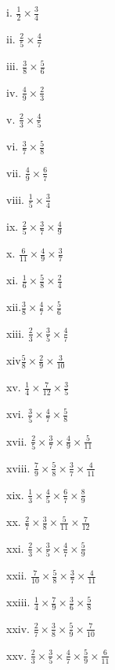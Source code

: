\documentclass[]{book}
\begin{document}
\begin{multicols}{2}
 
    i. $\frac{1}{2} \times \frac{3}{4}$
 
    ii. $\frac{2}{5} \times \frac{4}{7}$
 
    iii. $\frac{3}{8} \times \frac{5}{6}$
 
    iv. $\frac{4}{9} \times \frac{2}{3}$
 
    v. $\frac{2}{3} \times \frac{4}{5}$
 
    vi. $\frac{3}{7} \times \frac{5}{8}$
 
    vii. $\frac{4}{9} \times \frac{6}{7}$
 
    viii. $\frac{1}{5} \times \frac{3}{4}$
 
    ix. $\frac{2}{5} \times \frac{3}{7} \times \frac{4}{9}$
 
    x. $\frac{6}{11} \times \frac{4}{9} \times \frac{3}{7}$
 
    xi. $\frac{1}{6} \times \frac{5}{8} \times \frac{2}{4}$
 
    xii.$\frac{3}{8} \times \frac{4}{7} \times \frac{5}{6}$
 
    xiii. $\frac{2}{3} \times \frac{3}{5} \times \frac{4}{7}$
 
    xiv$\frac{5}{8} \times \frac{2}{9} \times \frac{3}{10}$
 
    xv. $\frac{1}{4} \times \frac{7}{12} \times \frac{3}{5}$
 
    xvi. $\frac{3}{5} \times \frac{4}{7} \times \frac{5}{8}$
 
    xvii. $\frac{2}{5} \times \frac{3}{7} \times \frac{4}{9} \times \frac{5}{11}$
 
    xviii. $\frac{7}{9} \times \frac{5}{8} \times \frac{3}{7} \times \frac{4}{11}$
 
    xix. $\frac{1}{3} \times \frac{4}{5} \times \frac{6}{7} \times \frac{8}{9}$
 
    xx. $\frac{2}{7} \times \frac{3}{8} \times \frac{5}{11} \times \frac{7}{12}$
 
    xxi. $\frac{2}{3} \times \frac{3}{5} \times \frac{4}{7} \times \frac{5}{9}$
 
    xxii. $\frac{7}{10} \times \frac{5}{8} \times \frac{3}{7} \times \frac{4}{11}$
 
    xxiii. $\frac{1}{4} \times \frac{7}{9} \times \frac{3}{6} \times \frac{5}{8}$
 
    xxiv. $\frac{2}{7} \times \frac{3}{8} \times \frac{5}{9} \times \frac{7}{10}$
 
    xxv. $\frac{2}{3} \times \frac{3}{5} \times \frac{4}{7} \times \frac{5}{9} \times \frac{6}{11}$
 

\end{multicols}
\end{document}
